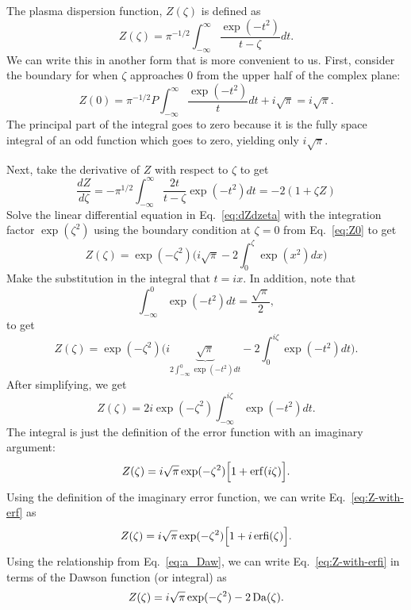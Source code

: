 The plasma dispersion function, $Z(\zeta)$ is defined as
\begin{equation}
	Z(\zeta) = \pi^{-1/2} \int_{-\infty}^{\infty} 
	\frac{\exp(-t^2)}{t-\zeta} dt.
	\label{eq:plasma-dispersion-function}
\end{equation}
We can write this in another form that is more convenient to us. 
First, consider the boundary for when $\zeta$ approaches 0 from the upper half of the complex plane:
\begin{equation}
	Z(0) = \pi^{-1/2}P\int_{-\infty}^\infty 
	\frac{\exp(-t^2)}{t}dt + i \sqrt{\pi} = i \sqrt{\pi}.
	\label{eq:Z0}
\end{equation}
The principal part of the integral goes to zero because it is the fully space integral of an odd function which goes to zero, yielding only $i\sqrt{\pi}$.

Next, take the derivative of $Z$ with respect to $\zeta$ to get
\begin{equation}
	\frac{dZ}{d\zeta} = - \pi^{1/2} \int_{-\infty}^\infty
	\frac{2 t}{t-\zeta} \exp(-t^2)dt 
	= -2(1+\zeta Z) %
	\label{eq:dZdzeta}
\end{equation}
Solve the linear differential equation in Eq.~\ref{eq:dZdzeta} with the integration factor $\exp(\zeta^2)$ using the boundary condition at $\zeta=0$ from Eq.~\ref{eq:Z0} to get
\begin{equation}
	Z(\zeta) = \exp(-\zeta^2)
	\bigg( i\sqrt{\pi} - 2 \int_0^\zeta \exp(x^2)dx  \bigg)
\end{equation}
Make the substitution in the integral that $t = ix$. In addition, note that
\begin{equation}
	\int_{-\infty}^0 \exp(-t^2) dt = \frac{\sqrt{\pi}}{2},
\end{equation}
to get
\begin{equation}
	Z(\zeta) = \exp(-\zeta^2)
	\bigg( i\underbrace{\sqrt{\pi}}_{2\int_{-\infty}^0 \exp(-t^2)dt} - 2 \int_0^{i\zeta} \exp(-t^2)dt  \bigg).
\end{equation}
After simplifying, we get
\begin{equation}
	Z(\zeta) = 2i \exp(-\zeta^2) \int_{-\infty}^{i\zeta} \exp(-t^2)dt.
\end{equation}
The integral is just the definition of the error function with an imaginary argument:
\begin{equation}
	Z(\zeta) = i \sqrt{\pi} \exp(-\zeta^2) \Big[ 1 + \operatorname{erf}(i\zeta) \Big].
	\label{eq:Z-with-erf}
\end{equation}
Using the definition of the imaginary error function, we can write Eq.~\ref{eq:Z-with-erf} as
\begin{equation}
	Z(\zeta) = i\sqrt{\pi} \exp(-\zeta^2) \Big[ 1+i\operatorname{erfi}(\zeta) \Big].
	\label{eq:Z-with-erfi}
\end{equation}
Using the relationship from Eq.~\ref{eq:a_Daw}, we can write Eq.~\ref{eq:Z-with-erfi} in terms of the Dawson function (or integral) as
\begin{equation}
	Z(\zeta) = i \sqrt{\pi} \exp(-\zeta^2) - 2 \operatorname{Da}(\zeta).
	\label{eq:Z-with-Da}
\end{equation}


